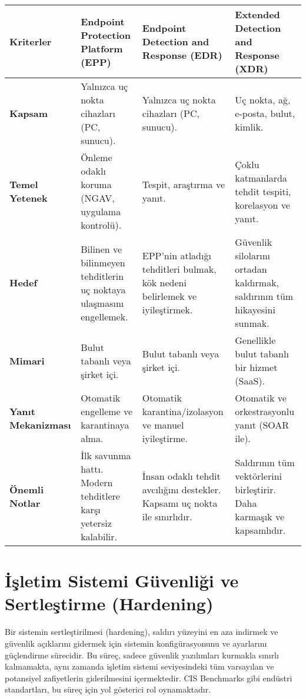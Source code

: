 \begin{longtable}{|p{4cm}|p{4cm}|p{4cm}|p{4cm}|}
\hline
\textbf{Kriterler} & \textbf{Endpoint Protection Platform (EPP)} & \textbf{Endpoint Detection and Response (EDR)} & \textbf{Extended Detection and Response (XDR)} \\
\hline
\textbf{Kapsam} & Yalnızca uç nokta cihazları (PC, sunucu). & Yalnızca uç nokta cihazları (PC, sunucu). & Uç nokta, ağ, e-posta, bulut, kimlik. \\
\hline
\textbf{Temel Yetenek} & Önleme odaklı koruma (NGAV, uygulama kontrolü). & Tespit, araştırma ve yanıt. & Çoklu katmanlarda tehdit tespiti, korelasyon ve yanıt. \\
\hline
\textbf{Hedef} & Bilinen ve bilinmeyen tehditlerin uç noktaya ulaşmasını engellemek. & EPP'nin atladığı tehditleri bulmak, kök nedeni belirlemek ve iyileştirmek. & Güvenlik silolarını ortadan kaldırmak, saldırının tüm hikayesini sunmak. \\
\hline
\textbf{Mimari} & Bulut tabanlı veya şirket içi. & Bulut tabanlı veya şirket içi. & Genellikle bulut tabanlı bir hizmet (SaaS). \\
\hline
\textbf{Yanıt Mekanizması} & Otomatik engelleme ve karantinaya alma. & Otomatik karantina/izolasyon ve manuel iyileştirme. & Otomatik ve orkestrasyonlu yanıt (SOAR ile). \\
\hline
\textbf{Önemli Notlar} & İlk savunma hattı. Modern tehditlere karşı yetersiz kalabilir. & İnsan odaklı tehdit avcılığını destekler. Kapsamı uç nokta ile sınırlıdır. & Saldırının tüm vektörlerini birleştirir. Daha karmaşık ve kapsamlıdır. \\
\hline
\end{longtable}

\newpage
\section{İşletim Sistemi Güvenliği ve Sertleştirme (Hardening)}

Bir sistemin sertleştirilmesi (hardening), saldırı yüzeyini en aza indirmek ve güvenlik açıklarını gidermek için sistemin konfigürasyonunu ve ayarlarını güçlendirme sürecidir. Bu süreç, sadece güvenlik yazılımları kurmakla sınırlı kalmamakta, aynı zamanda işletim sistemi seviyesindeki tüm varsayılan ve potansiyel zafiyetlerin giderilmesini içermektedir. CIS Benchmarks gibi endüstri standartları, bu süreç için yol gösterici rol oynamaktadır.

